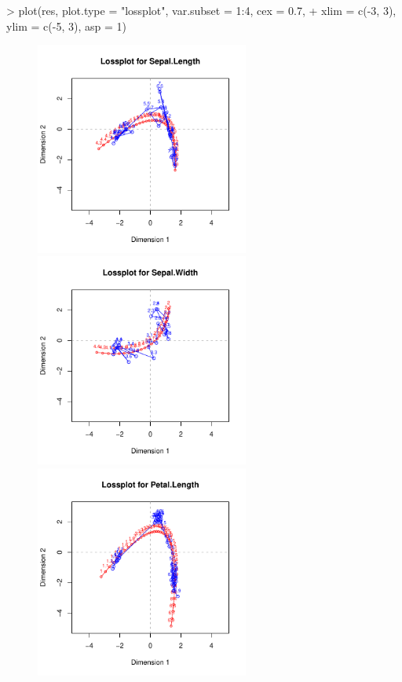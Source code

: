 \documentclass[article, nojss]{jss}
\begin{document}
\begin{Schunk}
\begin{Sinput}
> plot(res, plot.type = "lossplot", var.subset = 1:4, cex = 0.7, 
+     xlim = c(-3, 3), ylim = c(-5, 3), asp = 1)
\end{Sinput}
\end{Schunk}

\begin{figure}[hbt]
\begin{center}
\includegraphics[height=70mm, width=70mm]{irisLoss1.pdf}
\includegraphics[height=70mm, width=70mm]{irisLoss2.pdf}
\includegraphics[height=70mm, width=70mm]{irisLoss3.pdf}

\end{center}
\end{figure}
\end{document}
